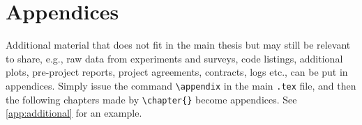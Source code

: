 \section{Appendices}

Additional material that does not fit in the main thesis but may still be relevant to share, e.g., raw data from experiments and surveys, code listings, additional plots, pre-project reports, project agreements, contracts, logs etc., can be put in appendices. Simply issue the command \texttt{\textbackslash appendix} in the main \texttt{.tex} file, and then the following chapters made by \texttt{\textbackslash chapter\{\}} become appendices. See \cref{app:additional} for an example.
